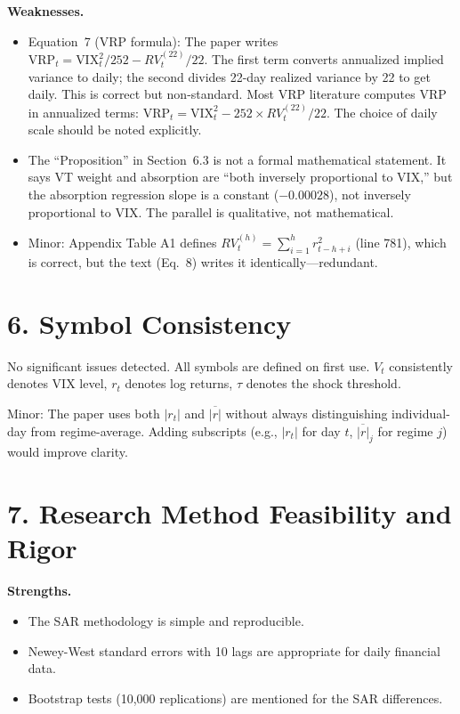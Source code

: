 \documentclass[12pt,a4paper]{article}
\begin{document}
\textbf{Weaknesses.}
\begin{itemize}[nosep]
  \item Equation~7 (VRP formula): The paper writes $\text{VRP}_t = \text{VIX}_t^2 / 252 - RV_t^{(22)} / 22$.  The first term converts annualized implied variance to daily; the second divides 22-day realized variance by 22 to get daily.  This is correct but non-standard.  Most VRP literature computes VRP in annualized terms: $\text{VRP}_t = \text{VIX}_t^2 - 252 \times RV_t^{(22)} / 22$.  The choice of daily scale should be noted explicitly.
  \item The ``Proposition'' in Section~6.3 is not a formal mathematical statement.  It says VT weight and absorption are ``both inversely proportional to VIX,'' but the absorption regression slope is a constant ($-0.00028$), not inversely proportional to VIX.  The parallel is qualitative, not mathematical.
  \item Minor: Appendix Table A1 defines $RV_t^{(h)} = \sum_{i=1}^{h} r_{t-h+i}^2$ (line 781), which is correct, but the text (Eq.~8) writes it identically---redundant.
\end{itemize}

\section*{6. Symbol Consistency}

No significant issues detected.  All symbols are defined on first use.  $V_t$ consistently denotes VIX level, $r_t$ denotes log returns, $\tau$ denotes the shock threshold.

Minor: The paper uses both $|r_t|$ and $\overline{|r|}$ without always distinguishing individual-day from regime-average.  Adding subscripts (e.g., $|r_t|$ for day $t$, $\overline{|r|}_j$ for regime $j$) would improve clarity.

\section*{7. Research Method Feasibility and Rigor}

\textbf{Strengths.}
\begin{itemize}[nosep]
  \item The SAR methodology is simple and reproducible.
  \item Newey-West standard errors with 10 lags are appropriate for daily financial data.
  \item Bootstrap tests (10,000 replications) are mentioned for the SAR differences.
\end{itemize}
\end{document}
